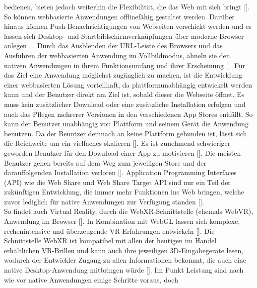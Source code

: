 \documentclass[a4paper,12pt,oneside]{article}
\begin{document}
        bedienen, bieten jedoch weiterhin die Flexibilität, die das Web mit sich bringt
        [\cite[2]{Ater2017}].
        So können webbasierte Anwendungen offlinefähig gestaltet werden. Darüber hinaus können
        Push-Benachrichtigungen von Webseiten verschickt werden und es lassen sich
        Desktop- und Startbildschirmverknüpfungen über moderne Browser anlegen [\cite[5-6]{Ater2017}].
        Durch das Ausblenden der URL-Leiste des Browsers
        und das Ausführen der webbasierten Anwendung im Vollbildmodus, ähneln sie den
        nativen Anwendungen in ihrem Funktionsumfang und ihrer Erscheinung [\cite[6]{Ater2017}]. 
        Für das Ziel eine Anwendung
        möglichst zugänglich zu machen, ist die Entwicklung einer webbasierten Lösung
        vorteilhaft, da plattformunabhängig entwickelt werden kann und der
        Benutzer direkt am Ziel ist, sobald dieser die Webseite öffnet.
        Es muss kein zusätzlicher
        Download oder eine zusätzliche Installation erfolgen und auch das Pflegen mehrerer
        Versionen in den verschiedenen App Stores entfällt. So kann der Benutzer unabhängig
        von Plattform und seinem Gerät die Anwendung benutzen. Da der Benutzer 
        demnach an keine Plattform
        gebunden ist, lässt sich die Reichweite um ein vielfaches skalieren [\cite[3]{Ater2017}].
        Es ist zunehmend schwieriger geworden Benutzer für den Download einer App 
        zu motivieren [\cite[3]{Ater2017}].
        Die meisten Benutzer gehen bereits auf dem Weg zum jeweiligen Store und der darauffolgenden
        Installation verloren [\cite[4]{Ater2017}]. Application Programming Interfaces (API) 
        wie die Web Share und Web Share Target
        API sind nur ein Teil der zukünftigen Entwicklung, die immer mehr Funktionen ins
        Web bringen, welche zuvor lediglich für native Anwendungen zur Verfügung standen [\cite[245]{Ater2017}]. \\
        So findet auch Virtual Reality, durch die WebXR-Schnittstelle (ehemals WebVR),
        Anwendung im Browser [\cite[245]{Ater2017}]. In Kombination mit WebGL lassen sich komplexe,
        rechenintensive und überzeugende VR-Erfahrungen entwickeln [\cite[245]{Ater2017}].
        Die Schnittstelle WebXR ist kompatibel mit allen der heutigen im Handel erhältlichen
        VR-Brillen und kann auch
        ihre jeweiligen 3D-Eingabegeräte lesen, wodurch der Entwickler Zugang zu allen Informationen
        bekommt, die auch eine native Desktop-Anwendung mitbringen würde [\cite[245]{Ater2017}].
        Im Punkt Leistung sind nach wie vor native Anwendungen einige Schritte voraus, doch
\end{document}
